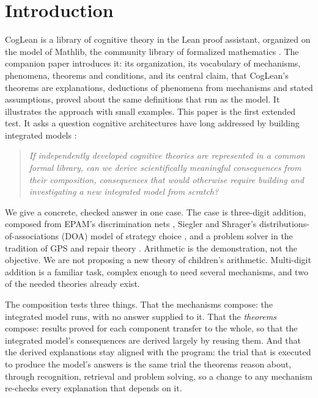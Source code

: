 \documentclass[11pt]{article}
\begin{document}
\section{Introduction}

CogLean \citep{coglean} is a library of cognitive theory in the Lean proof assistant, organized on the model of Mathlib, the community library of formalized mathematics \citep{mathlib2020,demoura2021}. The companion paper \citep{shrager2026coglean} introduces it: its organization, its vocabulary of mechanisms, phenomena, theorems and conditions, and its central claim, that CogLean's theorems are explanations, deductions of phenomena from mechanisms and stated assumptions, proved about the same definitions that run as the model. It illustrates the approach with small examples. This paper is the first extended test. It asks a question cognitive architectures have long addressed by building integrated models \citep{newell1990,anderson2007,laird2012}:

\begin{quote}
\emph{If independently developed cognitive theories are represented in a common formal library, can we derive scientifically meaningful consequences from their composition, consequences that would otherwise require building and investigating a new integrated model from scratch?}
\end{quote}

We give a concrete, checked answer in one case. The case is three-digit addition, composed from EPAM's discrimination nets \citep{feigenbaum1959,feigenbaum1962}, Siegler and Shrager's distributions-of-associations (DOA) model of strategy choice \citep{siegler1984}, and a problem solver in the tradition of GPS and repair theory \citep{newell1972,brown1980}. Arithmetic is the demonstration, not the objective. We are not proposing a new theory of children's arithmetic. Multi-digit addition is a familiar task, complex enough to need several mechanisms, and two of the needed theories already exist.

The composition tests three things. That the mechanisms compose: the integrated model runs, with no answer supplied to it. That the \emph{theorems} compose: results proved for each component transfer to the whole, so that the integrated model's consequences are derived largely by reusing them. And that the derived explanations stay aligned with the program: the trial that is executed to produce the model's answers is the same trial the theorems reason about, through recognition, retrieval and problem solving, so a change to any mechanism re-checks every explanation that depends on it.
\end{document}
